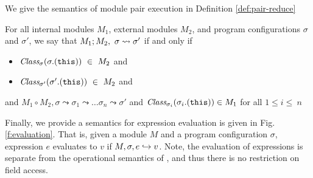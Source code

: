 We give the semantics of module pair execution in Definition \ref{def:pair-reduce}
\begin{definition}
\label{def:pair-reduce}
For all internal modules $M_1$, external modules $M_2$, and program configurations $\sigma$ and $\sigma'$, 
we say that $M_1 ; M_2,\ \sigma \leadsto \sigma'$ if and only if
\begin{itemize}
\item
$\class{\sigma}{\sigma.(\texttt{this})}\ \in\ M_2$ and
\item
$\class{\sigma'}{\sigma'.(\texttt{this})}\ \in\ M_2$ and 
\end{itemize} 
and
$M_1 \circ M_2, \sigma \leadsto \sigma_1 \leadsto \ldots \sigma_n \leadsto \sigma'$ and $\textit{Class}_{\sigma_i}(\sigma_i.(\texttt{this})) \in M_1$ for all $1 \leq i \leq\ n$
\end{definition}

Finally, we provide a semantics for expression evaluation is given in Fig. \ref{f:evaluation}. 
That is, given a module $M$ and a program configuration $\sigma$, expression $e$ evaluates to $v$
if $M, \sigma, e \hookrightarrow v$. Note, the evaluation of expressions is separate from the operational
semantics of \Loo, and thus there is no restriction on field access.